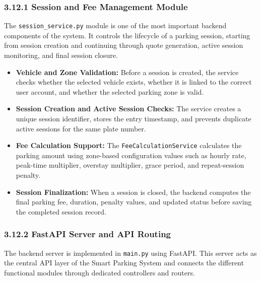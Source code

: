\documentclass[12pt,a4paper,oneside]{report}
\begin{document}
\subsubsection*{3.12.1 Session and Fee Management Module}

The \texttt{session\_service.py} module is one of the most important backend components of the system. It controls the lifecycle of a parking session, starting from session creation and continuing through quote generation, active session monitoring, and final session closure.

\begin{itemize}[leftmargin=2em]
    \item \textbf{Vehicle and Zone Validation:} Before a session is created, the service checks whether the selected vehicle exists, whether it is linked to the correct user account, and whether the selected parking zone is valid.

    \item \textbf{Session Creation and Active Session Checks:} The service creates a unique session identifier, stores the entry timestamp, and prevents duplicate active sessions for the same plate number.

    \item \textbf{Fee Calculation Support:} The \texttt{FeeCalculationService} calculates the parking amount using zone-based configuration values such as hourly rate, peak-time multiplier, overstay multiplier, grace period, and repeat-session penalty.

    \item \textbf{Session Finalization:} When a session is closed, the backend computes the final parking fee, duration, penalty values, and updated status before saving the completed session record.
\end{itemize}

\subsubsection*{3.12.2 FastAPI Server and API Routing}

The backend server is implemented in \texttt{main.py} using FastAPI. This server acts as the central API layer of the Smart Parking System and connects the different functional modules through dedicated controllers and routers.
\end{document}
